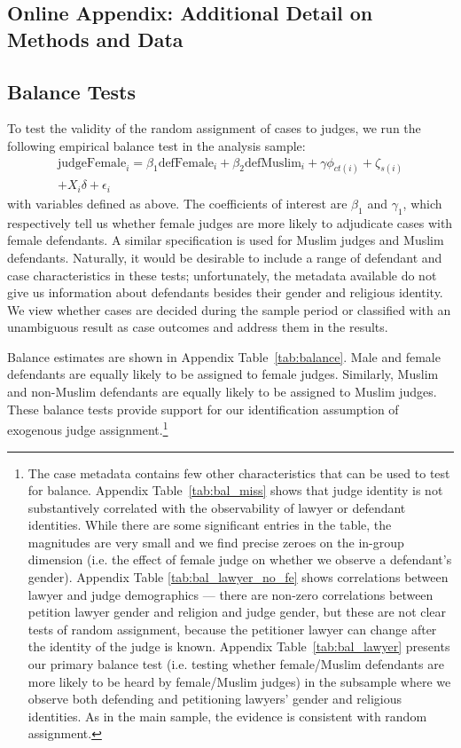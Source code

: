 \documentclass[12pt,english]{article}
\begin{document}
\begin{appendices}
\section{Online Appendix: Additional Detail on Methods and Data}

\subsection{Balance Tests}
\label{appsec:balance}

To test the validity of the random assignment of cases to judges, we run the following empirical balance test in the analysis sample:
\begin{equation}
\label{eq:random_female}
    \begin{split}
          \text{judgeFemale}_{i} = \beta_{1} \text{defFemale}_{i} + \beta_{2} \text{defMuslim}_{i}
          + \gamma \phi_{ct(i)} + \zeta_{s(i)} \\ + X_i \delta + \epsilon_{i}
    \end{split}
\end{equation}
with variables defined as above. The coefficients of interest are $\beta_{1}$ and $\gamma_{1}$, which respectively tell us whether female judges are more likely to adjudicate cases with female defendants. A similar specification is used for Muslim judges and Muslim defendants. Naturally, it would be desirable to include a range of defendant and case characteristics in these tests; unfortunately, the metadata available do not give us information about defendants besides their gender and religious identity. We view whether cases are decided during the sample period or classified with an unambiguous result as case outcomes and address them in the results.

Balance estimates are shown in Appendix Table~\ref{tab:balance}. Male and female defendants are equally likely to be assigned to female judges. Similarly, Muslim and non-Muslim defendants are equally likely to be assigned to Muslim judges. These balance tests provide support for our identification assumption of exogenous judge assignment.\footnote{The case metadata contains few other characteristics that can be used to test for balance. Appendix Table~\ref{tab:bal_miss} shows that judge identity is not substantively correlated with the observability of lawyer or defendant identities. While there are some significant entries in the table, the magnitudes are very small and we find precise zeroes on the in-group dimension (i.e. the effect of female judge on whether we observe a defendant's gender). Appendix Table \ref{tab:bal_lawyer_no_fe} shows correlations between lawyer and judge demographics --- there are non-zero correlations between petition lawyer gender and religion and judge gender, but these are not clear tests of random assignment, because the petitioner lawyer can change after the identity of the judge is known. Appendix Table~\ref{tab:bal_lawyer} presents our primary balance test (i.e. testing whether female/Muslim defendants are more likely to be heard by female/Muslim judges) in the subsample where we observe both defending and petitioning lawyers' gender and religious identities. As in the main sample, the evidence is consistent with random assignment.

}
\end{appendices}
\end{document}
